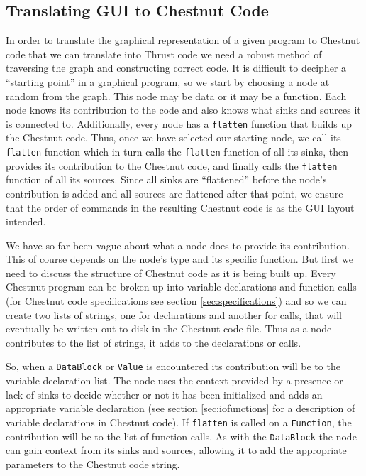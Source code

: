 \documentclass[twocolumn]{article}
\renewcommand{\|}{\origbar} %
\newcommand{\code}[1]{\texttt{#1}}
\begin{document}
\subsection{Translating GUI to Chestnut Code} 
\fi

In order to translate the graphical representation of a given program to Chestnut code that we can translate into Thrust code we need a robust method of traversing the graph and constructing correct code. It is difficult to decipher a ``starting point'' in a graphical program, so we start by choosing a node at random from the graph. This node may be data or it may be a function. Each node knows its contribution to the code and also knows what sinks and sources it is connected to. Additionally, every node has a \code{flatten} function that builds up the Chestnut code. Thus, once we have selected our starting node, we call its \code{flatten} function which in turn calls the \code{flatten} function of all its sinks, then provides its contribution to the Chestnut code, and finally calls the \code{flatten} function of all its sources. Since all sinks are ``flattened'' before the node's contribution is added and all sources are flattened after that point, we ensure that the order of commands in the resulting Chestnut code is as the GUI layout intended.

We have so far been vague about what a node does to provide its contribution. This of course depends on the node's type and its specific function. But first we need to discuss the structure of Chestnut code as it is being built up. Every Chestnut program can be broken up into variable declarations and function calls (for Chestnut code specifications see section \ref{sec:specifications}) and so we can create two lists of strings, one for declarations and another for calls, that will eventually be written out to disk in the Chestnut code file. Thus as a node contributes to the list of strings, it adds to the declarations or calls. 

So, when a \code{DataBlock} or \code{Value} is encountered its contribution will be to the variable declaration list. The node uses the context provided by a presence or lack of sinks to decide whether or not it has been initialized and adds an appropriate variable declaration (see section \ref{sec:iofunctions} for a description of variable declarations in Chestnut code). If \code{flatten} is called on a \code{Function}, the contribution will be to the list of function calls. As with the \code{DataBlock} the node can gain context from its sinks and sources, allowing it to add the appropriate parameters to the Chestnut code string.
\end{document}
